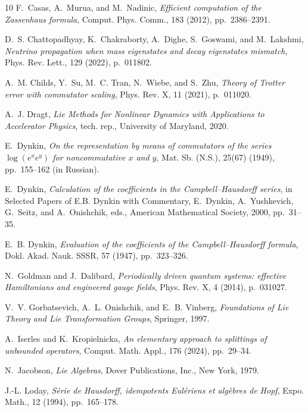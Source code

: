 \documentclass[11pt]{article}
\begin{document}
\begin{thebibliography}{10}
{\sc F.~Casas, A.~Murua, and M.~Nadinic}, {\em Efficient computation of the
  {Z}assenhaus formula}, Comput. Phys. Comm., 183 (2012), pp.~2386--2391.

{\sc D.~S. Chattopadhyay, K.~Chakraborty, A.~Dighe, S.~Goswami, and
  M.~Lakshmi}, {\em Neutrino propagation when mass eigenstates and decay
  eigenstates mismatch}, Phys. Rev. Lett., 129 (2022), p.~011802.

{\sc A.~M. Childs, Y.~Su, M.~C. Tran, N.~Wiebe, and S.~Zhu}, {\em Theory of
  {T}rotter error with commutator scaling}, Phys. Rev. X, 11 (2021), p.~011020.

{\sc A.~J. Dragt}, {\em Lie {M}ethods for {N}onlinear {D}ynamics with
  {A}pplications to {A}ccelerator {P}hysics}, tech. rep., University of
  Maryland, 2020.

{\sc E.~Dynkin}, {\em On the representation by means of commutators of the
  series $\log(e^x e^y)$ for noncommutative $x$ and $y$}, Mat. Sb. (N.S.),
  25(67) (1949), pp.~155--162 (in {R}ussian).

{\sc E.~Dynkin}, {\em Calculation of the
  coefficients in the {C}ampbell--{H}ausdorff series}, in Selected {P}apers of
  {E.B.} {D}ynkin with {C}ommentary, E.~Dynkin, A.~Yushkevich, G.~Seitz, and
  A.~Onishchik, eds., {A}merican {M}athematical {S}ociety, 2000, pp.~31--35.

{\sc E.~B. Dynkin}, {\em Evaluation of the coefficients of the
  {C}ampbell--{H}ausdorff formula}, Dokl. Akad. Nauk. SSSR, 57 (1947),
  pp.~323--326.

{\sc N.~Goldman and J.~Dalibard}, {\em Periodically driven quantum systems:
  effective {H}amiltonians and engineered gauge fields}, Phys. Rev. X, 4
  (2014), p.~031027.

{\sc V.~V. Gorbatsevich, A.~L. Onishchik, and E.~B. Vinberg}, {\em Foundations
  of {L}ie {T}heory and {L}ie {T}ransformation {G}roups}, Springer, 1997.

{\sc A.~Iserles and K.~Kropielnicka}, {\em An elementary approach to splittings
  of unbounded operators}, Comput. Math. Appl., 176 (2024), pp.~29--34.

{\sc N.~Jacobson}, {\em {L}ie {A}lgebras}, Dover Publications, Inc., New York,
  1979.

{\sc J.-L. Loday}, {\em S\'erie de {H}ausdorff, idempotents {E}ul\'eriens et
  alg\`ebres de {H}opf}, Expo. Math., 12 (1994), pp.~165--178.


\end{thebibliography}
\end{document}
